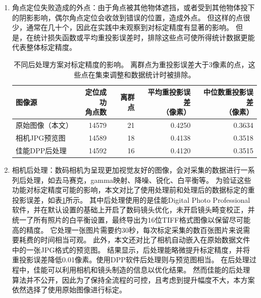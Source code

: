 \begin{enumerate}
\item 角点定位失败造成的外点：由于角点被其他物体遮挡，或者受到其他物体投下的阴影影响，偶尔角点定位会收敛到错误的位置，造成外点。
但这样的点很少，通常在几十个，因此在实践中未观察到对标定精度有显著的影响。
但是，在统计损失函数或平均重投影误差时，排除这些点可使所得统计数据更能代表整体标定精度。

\begin{table}
    \centering
    \caption[不同后处理方案对标定精度的影响]{
        不同后处理方案对标定精度的影响。
        离群点为重投影误差大于3像素的点，这些点在集束调整和数据统计时被排除。
    }
    \begin{tabular}{l|rrrr}
        \toprule
        图像源 & \shortstack{定位成功\\角点数} & 离群点 & \shortstack{平均重投影误差\\（像素）}& \shortstack{中位数重投影误差\\（像素）} \\
        \midrule
        原始图像（本文） & 14579 & 21 & 0.4250 & 0.3634 \\
        相机JPG预览图   & 14589 & 18 & 0.4138 & 0.3518 \\
        佳能DPP后处理   & 14592 & 16 & 0.4120 & 0.3515 \\
        \bottomrule
    \end{tabular}
    \label{tab:camera_postprocess}
\end{table}

\item 相机后处理：数码相机为呈现更加视觉友好的图像，会对采集的数据进行一系列后处理，如去马赛克，gamma映射、降噪、锐化、白平衡等。
为验证这些功能对标定精度可能的影响，本文对比了使用处理前和处理后的数据标定的重投影误差，如表\ref{tab:camera_postprocess}所示。
其中后处理使用的是佳能Digital Photo Professional软件，并在默认设置的基础上开启了数码镜头优化，未开启镜头畸变校正，并统一了所有照片的白平衡设置，最终导出为16位TIFF格式图像以保留尽可能高的精度。
它处理一张图片需要约30秒，每次标定采集的数百张图片来说需要耗费的时间相当可观。
此外，本文还对比了相机自动嵌入在原始数据文件中的一张JPG格式的预览图。
结果显示，后处理能略微提升标定精度，并将重投影误差降低0.01像素。使用DPP软件后处理则与预览图相当。
在后处理过程中，佳能可以利用相机和镜头制造的信息以优化结果。
然而佳能的后处理算法并不公开，因此为了保持全流程的可控，且考虑到提升幅度不大，本方案依然选择了使用原始图像进行标定。
\end{enumerate}
